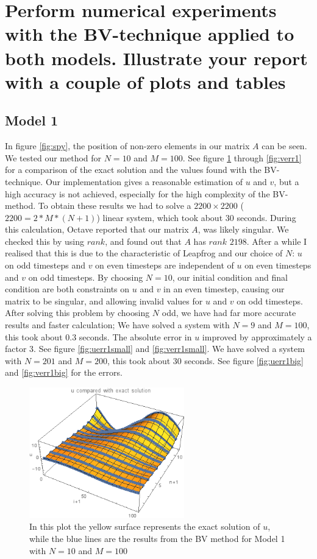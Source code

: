 \documentclass{article}
\renewcommand{\(}{\left(}
\renewcommand{\)}{\right)}
\begin{document}
\clearpage

\section*{Perform numerical experiments with the BV-technique applied to both models. Illustrate your report with a couple of plots and tables}
\subsection*{Model 1}
In figure \ref{fig:spy}, the position of non-zero elements in our matrix $A$ can be seen.
We tested our method for $N = 10$ and $M = 100$. See figure \ref{fig:ucomp1} through \ref{fig:verr1} for a comparison of the exact solution and the values found with the BV-technique. Our implementation gives a reasonable estimation of $u$ and $v$, but a high accuracy is not achieved, especially for the high complexity of the BV-method. To obtain these results we had to solve a $2200\times2200$ ($2200 = 2*M*(N+1)$) linear system, which took about 30 seconds. During this calculation, Octave reported that our matrix $A$, was likely singular. We checked this by using $rank$, and found out that $A$ has $rank$ $2198$. After a while I realised that this is due to the characteristic of Leapfrog and our choice of $N$: $u$ on odd timesteps and $v$ on even timesteps are independent of $u$ on even timesteps and $v$ on odd timesteps. By choosing $N = 10$, our initial condition and final condition are both constraints on $u$ and $v$ in an even timestep, causing our matrix to be singular, and allowing invalid values for $u$ and $v$ on odd timesteps. After solving this problem by choosing $N$ odd, we have had far more accurate results and faster calculation;%
We have solved a system with $N = 9$ and $M = 100$, this took about $0.3$ seconds. The absolute error in $u$ improved by approximately a factor 3. See figure \ref{fig:uerr1small} and \ref{fig:verr1small}.
We have solved a system with $N = 201$ and $M = 200$, this took about $30$ seconds. See figure \ref{fig:uerr1big} and \ref{fig:verr1big} for the errors.

\begin{figure}
\centering
\includegraphics[width=0.6\textwidth]{uCompared.png}
\caption{In this plot the yellow surface represents the exact solution of $u$, while the blue lines are the results from the BV method for Model 1 with $N=10$ and $M=100$}
\label{fig:ucomp1}
\end{figure}
\end{document}
